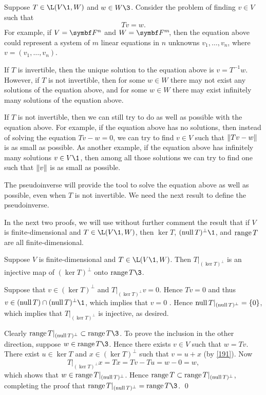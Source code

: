 Suppose $T \in \L(V\1, W)$ and $w \in W\3$. Consider the problem of finding $v \in V$ such that
\[
Tv = w.
\]
For example, if $V = \F n$ and $W = \FF m$, then the equation above could represent a system of $m$ linear equations in $n$ unknowns $v_1, \ldots, v_n$, where $v = (v_1, \ldots, v_n)$.

If $T$ is invertible, then the unique solution to the equation above is $v = T^{-1}w$. However, if $T$ is not invertible, then for some
$w \in W$ there may not exist any solutions of the equation above, and for some $w \in W$ there may exist infinitely many solutions of the equation above.

If $T$ is not invertible, then we can still try to do as well as possible with the equation above. For example, if the equation above has no solutions, then instead of solving the equation $Tv - w = 0$, we can try to find $v \in V$ such that $\lVert Tv - w\rVert$ is as small as possible. As another example, if the equation above has infinitely many solutions $v \in V\1$, then among all those solutions we can try to find one such that $\lVert v\rVert$ is as small as possible.

The pseudoinverse will provide the tool to solve the equation above as well as possible, even when $T$ is not invertible. We need the next result to define the pseudoinverse.

In the next two proofs, we will use without further comment the result that if $V$ is finite-dimensional and $T \in \L(V\1,W)$, then $\ker T$, $(\ker T)^\perp\1$, and $\operatorname{range} T$ are all finite-dimensional.

{Suppose $V$ is finite-dimensional and $T \in \L(V\1, W)$. Then $T|_{(\ker T)^\perp}$ is an injective map of $(\ker T)^\perp$ onto $\ran T\3$.}

\proof
Suppose that $v \in (\ker T)^\perp$ and $T|_{(\ker T)^\perp}v = 0$. Hence $Tv = 0$ and thus $v \in (\ker T) \cap (\ker T)^\perp\1$, which implies that
$v = 0$ . Hence $\operatorname{null} T|_{(\operatorname{null} T)^\perp} = \{0\}$, which implies that $T|_{(\ker T)^\perp}$ is injective, as desired.

Clearly $\ran T|_{(\ker T)^\perp} \subset \ran T\3$. To prove the inclusion in the other direction, suppose $w \in \ran T\3$. Hence there exists $v \in V$ such that $w = Tv$. There exist $u \in \ker T$ and $x \in (\ker T)^\perp$ such that $v = u + x$ (by \ref{191}). Now
\[
T|_{(\ker T)^\perp}x = Tx = Tv - Tu = w - 0 = w,
\]
which shows that $w \in \operatorname{range} T|_{(\operatorname{null} T)^\perp}$. Hence $\operatorname{range} T \subset \operatorname{range} T|_{(\operatorname{null} T)^\perp}$, completing the proof that
$\ran T|_{(\ker T)^\perp} = \ran T\3$.
\qed

